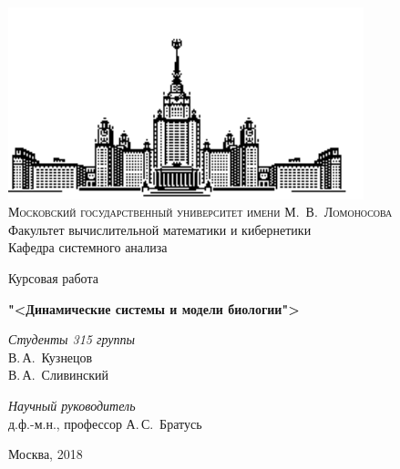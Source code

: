 \documentclass[11pt, oneside, final]{article}
\numberwithin{equation}{section}
\theoremstyle{definition}
\theoremstyle{remark}
\theoremstyle{plain}
\begin{document}
    \thispagestyle{empty}
    \begin{center}
        \ \vspace{-3cm}
    
        \includegraphics[width=0.5
        \textwidth]{msu}\\
        {\scshape Московский государственный университет имени М.~В.~Ломоносова}\\
        Факультет вычислительной математики и кибернетики\\
        Кафедра системного анализа
    
        \vfill
    
        {\LARGE Курсовая работа}
    
        \vspace{1cm}
    
        {\Huge\bfseries "<Динамические системы и модели биологии">} 
    \end{center}

    \vspace{1cm}
    \begin{flushright}
        \large \textit{Студенты 315 группы}\\
        В.\,А.~Кузнецов\\
        В.\,А.~Сливинский
    
        \vspace{5mm}
    
        \textit{Научный руководитель}\\
        д.ф.-м.н., профессор А.\,С.~Братусь
    \end{flushright}

    \vfill
    \begin{center}
        Москва, 2018 
    \end{center}
    \pagebreak

    \tableofcontents

    \pagebreak
    
    
    \pagebreak
    
\end{document}
